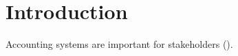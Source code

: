 \section{Introduction} \label{sec:Introduction}

Accounting systems are important for stakeholders (\cite{Boczko:2012:IAI:2331376}).
